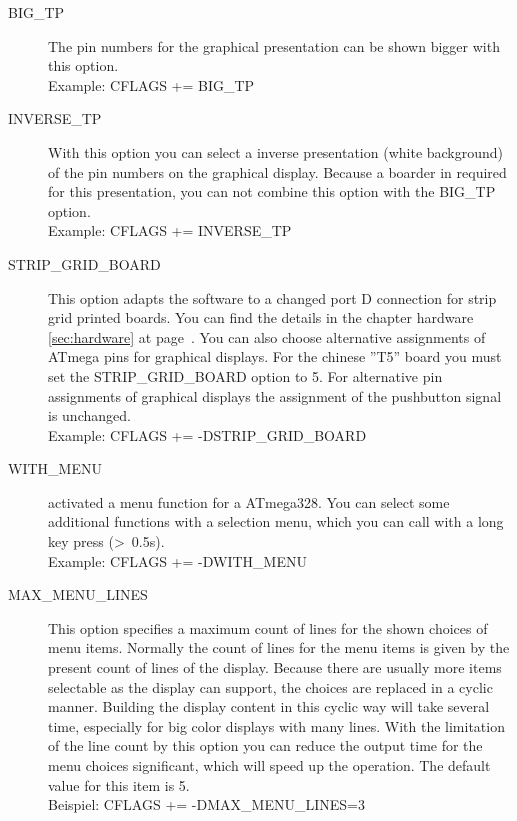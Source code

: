 \begin{description}
 \item[BIG\_TP] The pin numbers for the graphical presentation can be shown bigger with this option.\\
Example: CFLAGS += BIG\_TP

 \item[INVERSE\_TP] With this option you can select a inverse presentation (white background) of the pin numbers
on the graphical display.
Because a boarder in required for this presentation, you can not combine this option with the BIG\_TP option.\\
Example: CFLAGS += INVERSE\_TP

  \item[STRIP\_GRID\_BOARD] This option adapts the software to a changed port D connection for strip grid printed boards.
You can find the details in the chapter hardware \ref{sec:hardware} at page~\pageref{sec:hardware}.
You can also choose alternative assignments of ATmega pins for graphical displays.
For the chinese ''T5'' board you must set the STRIP\_GRID\_BOARD option to 5.
For alternative pin assignments of graphical displays the assignment of the pushbutton signal is unchanged.\\
Example: CFLAGS += -DSTRIP\_GRID\_BOARD

  \item[WITH\_MENU] activated a menu function for a ATmega328. You can select some additional functions with a
selection menu, which you can call with a long key press (\textgreater~0.5s).\\
Example: CFLAGS += -DWITH\_MENU

 \item[MAX\_MENU\_LINES]
This option specifies a maximum count of lines for the shown choices of menu items.
Normally the count of lines for the menu items is given by the present count of lines of the display.
Because there are usually more items selectable as the display can support,
the choices are replaced in a cyclic manner.
Building the display content in this cyclic way will take several time, especially for big color displays 
with many lines.
With the limitation of the line count by this option you can reduce the output time for the menu choices significant,
which will speed up the operation.
The default value for this item is 5.\\
Beispiel: CFLAGS += -DMAX\_MENU\_LINES=3



\end{description}
